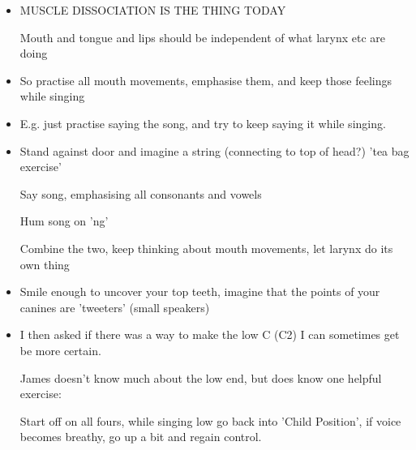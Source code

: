 \documentclass[14pt,a4paper]{memoir}
\begin{document}
\begin{itemize}
  \item MUSCLE DISSOCIATION IS THE THING TODAY

    Mouth and tongue and lips should be independent of what larynx etc are doing

  \item So practise all mouth movements, emphasise them, and keep those feelings while singing

  \item E.g. just practise saying the song, and try to keep saying it while singing.

  \item Stand against door and imagine a string (connecting to top of head?) 'tea bag exercise'

    Say song, emphasising all consonants and vowels

    Hum song on 'ng'

    Combine the two, keep thinking about mouth movements, let larynx do its own thing

  \item Smile enough to uncover your top teeth, imagine that the points of your canines are 'tweeters' (small speakers)


  \item I then asked if there was a way to make the low C (C2) I can sometimes get be more certain.

  James doesn't know much about the low end, but does know one helpful exercise:

  Start off on all fours, while singing low go back into 'Child Position', if voice becomes breathy, go up a bit and regain control.
  

\end{itemize}
\end{document}
